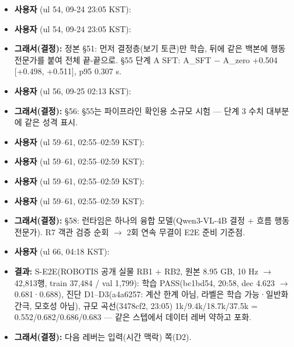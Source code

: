 \begin{itemize}
  \item \textbf{사용자} (ul 54, 09-24 23:05 KST): 
  \item \textbf{사용자} (ul 54, 09-24 23:05 KST): 
  \item \textbf{그래서(결정):} 정본 §51: 먼저 결정층(보기 토큰)만 학습, 뒤에 같은 백본에 행동 전문가를 붙여 전체 끝-끝으로. §55 단계 A SFT: A\_SFT $-$ A\_zero +0.504 [+0.498, +0.511], p95 0.307 s.
  \item \textbf{사용자} (ul 56, 09-25 02:13 KST): 
  \item \textbf{그래서(결정):} §56: §55는 파이프라인 확인용 소규모 시험 --- 단계 3 수치 대부분에 같은 성격 표시.
  \item \textbf{사용자} (ul 59--61, 02:55--02:59 KST): 
  \item \textbf{사용자} (ul 59--61, 02:55--02:59 KST): 
  \item \textbf{사용자} (ul 59--61, 02:55--02:59 KST): 
  \item \textbf{사용자} (ul 59--61, 02:55--02:59 KST): 
  \item \textbf{그래서(결정):} §58: 런타임은 하나의 융합 모델(Qwen3-VL-4B 결정 + 흐름 행동 전문가). R7 객관 검증 순회 $\rightarrow$ 2회 연속 무결이 E2E 준비 기준점.
  \item \textbf{사용자} (ul 66, 04:18 KST): 
  \item \textbf{결과:} S-E2E(ROBOTIS 공개 실물 RB1 + RB2, 원본 8.95 GB, 10 Hz $\rightarrow$ 42,813행, train 37,484 / val 1,799): 학습 PASS(bc1bd54, 20:58, dec 4.623 $\rightarrow$ 0.681·0.688), 진단 D1--D3(a4a6257: 계산 한계 아님, 라벨은 학습 가능·일반화 간극, 모호성 아님), 규모 곡선(3478cf2, 23:05) 1k/9.4k/18.7k/37.5k = 0.552/0.682/0.686/0.683 --- 같은 스텝에서 데이터 레버 약하고 포화.
  \item \textbf{그래서(결정):} 다음 레버는 입력(시간 맥락) 쪽(D2).
\end{itemize}

